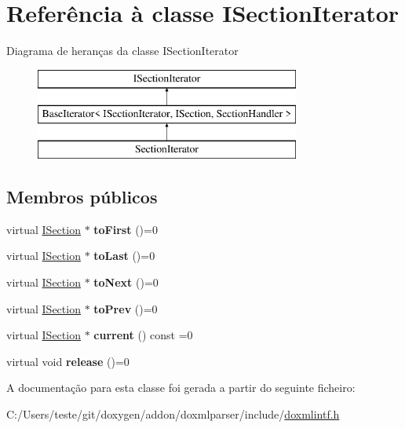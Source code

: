\hypertarget{class_i_section_iterator}{\section{Referência à classe I\-Section\-Iterator}
\label{class_i_section_iterator}
}
Diagrama de heranças da classe I\-Section\-Iterator\begin{figure}[H]
\begin{center}
\leavevmode
\includegraphics[height=3.000000cm]{class_i_section_iterator}
\end{center}
\end{figure}
\subsection*{Membros públicos}
\begin{DoxyCompactItemize}
\item 
\hypertarget{class_i_section_iterator_ab4099f8964924a0bc3388ee722116345}{virtual \hyperlink{class_i_section}{I\-Section} $\ast$ {\bfseries to\-First} ()=0}\label{class_i_section_iterator_ab4099f8964924a0bc3388ee722116345}

\item 
\hypertarget{class_i_section_iterator_a44545eaccbc3a31774b0bcae0570c3fb}{virtual \hyperlink{class_i_section}{I\-Section} $\ast$ {\bfseries to\-Last} ()=0}\label{class_i_section_iterator_a44545eaccbc3a31774b0bcae0570c3fb}

\item 
\hypertarget{class_i_section_iterator_a3a3567ed22a8e3cb94ed9a4ba36cb3a4}{virtual \hyperlink{class_i_section}{I\-Section} $\ast$ {\bfseries to\-Next} ()=0}\label{class_i_section_iterator_a3a3567ed22a8e3cb94ed9a4ba36cb3a4}

\item 
\hypertarget{class_i_section_iterator_aeb69e1c5cb8367eef8904de83272baf8}{virtual \hyperlink{class_i_section}{I\-Section} $\ast$ {\bfseries to\-Prev} ()=0}\label{class_i_section_iterator_aeb69e1c5cb8367eef8904de83272baf8}

\item 
\hypertarget{class_i_section_iterator_afa670e9cbbae64edefb94e35c5551d08}{virtual \hyperlink{class_i_section}{I\-Section} $\ast$ {\bfseries current} () const =0}\label{class_i_section_iterator_afa670e9cbbae64edefb94e35c5551d08}

\item 
\hypertarget{class_i_section_iterator_aab0a52fdd148a54108e7bf49287d7c47}{virtual void {\bfseries release} ()=0}\label{class_i_section_iterator_aab0a52fdd148a54108e7bf49287d7c47}

\end{DoxyCompactItemize}


A documentação para esta classe foi gerada a partir do seguinte ficheiro\-:\begin{DoxyCompactItemize}
\item 
C\-:/\-Users/teste/git/doxygen/addon/doxmlparser/include/\hyperlink{include_2doxmlintf_8h}{doxmlintf.\-h}\end{DoxyCompactItemize}
